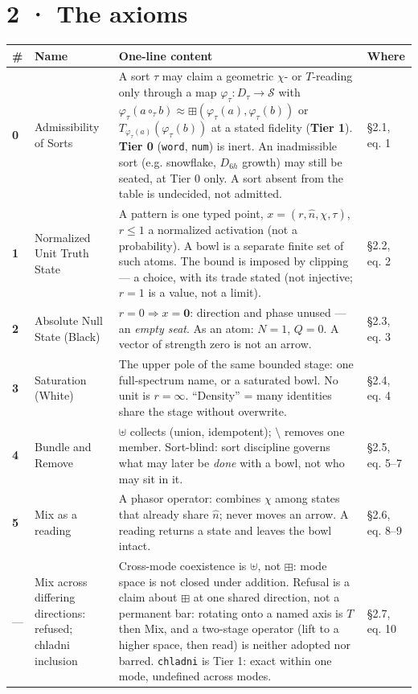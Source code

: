 \documentclass[10.5pt]{article}
\begin{document}
\section*{2 · The axioms}
{\small\setlength{\tabcolsep}{4pt}\begin{longtable}{L{0.8cm}L{3.1cm}L{10.3cm}L{1.8cm}}
\toprule
\textbf{\#} & \textbf{Name} & \textbf{One-line content} & \textbf{Where} \\
\midrule
\endhead
\textbf{0} & Admissibility of Sorts & A sort $\tau$ may claim a geometric $\chi$- or $T$-reading only through a map $\varphi_\tau:D_\tau\to\mathcal S$ with $\varphi_\tau(a\circ_\tau b)\approx\boxplus(\varphi_\tau(a),\varphi_\tau(b))$ or $T_{\varphi_\tau(a)}(\varphi_\tau(b))$ at a stated fidelity (\textbf{Tier 1}). \textbf{Tier 0} (\texttt{word}, \texttt{num}) is inert. An inadmissible sort (e.g. snowflake, $D_{6h}$ growth) may still be seated, at Tier 0 only. A sort absent from the table is undecided, not admitted. & §2.1, eq. 1 \\
\textbf{1} & Normalized Unit Truth State & A pattern is one typed point, $x=(r,\hat n,\chi,\tau)$, $r\le1$ a normalized activation (not a probability). A bowl is a separate finite set of such atoms. The bound is imposed by clipping — a choice, with its trade stated (not injective; $r=1$ is a value, not a limit). & §2.2, eq. 2 \\
\textbf{2} & Absolute Null State (Black) & $r=0\Rightarrow x=\mathbf0$: direction and phase unused — an \emph{empty seat}. As an atom: $N=1$, $Q=0$. A vector of strength zero is not an arrow. & §2.3, eq. 3 \\
\textbf{3} & Saturation (White) & The upper pole of the same bounded stage: one full-spectrum name, or a saturated bowl. No unit is $r=\infty$. “Density” = many identities share the stage without overwrite. & §2.4, eq. 4 \\
\textbf{4} & Bundle and Remove & $\uplus$ collects (union, idempotent); $\setminus$ removes one member. Sort-blind: sort discipline governs what may later be \emph{done} with a bowl, not who may sit in it. & §2.5, eq. 5–7 \\
\textbf{5} & Mix as a reading & A phasor operator: combines $\chi$ among states that already share $\hat n$; never moves an arrow. A reading returns a state and leaves the bowl intact. & §2.6, eq. 8–9 \\
— & Mix across differing directions: refused; chladni inclusion & Cross-mode coexistence is $\uplus$, not $\boxplus$: mode space is not closed under addition. Refusal is a claim about $\boxplus$ at one shared direction, not a permanent bar: rotating onto a named axis is $T$ then Mix, and a two-stage operator (lift to a higher space, then read) is neither adopted nor barred. \texttt{chladni} is Tier 1: exact within one mode, undefined across modes. & §2.7, eq. 10 \\

\end{longtable}}
\end{document}
